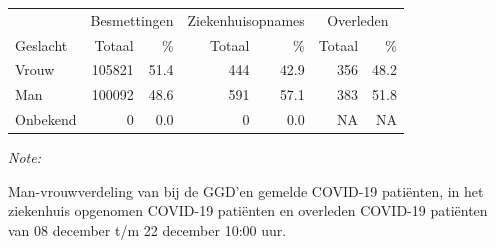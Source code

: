 \documentclass[
  english,
  man,floatsintext]{apa6}
\begin{document}
\begin{table}
\centering\begingroup\fontsize{11}{13}\selectfont

\begin{threeparttable}
\begin{tabular}{lrrrrrr}
\toprule
\multicolumn{1}{c}{ } & \multicolumn{2}{c}{Besmettingen} & \multicolumn{2}{c}{Ziekenhuisopnames} & \multicolumn{2}{c}{Overleden} \\
\cmidrule(l{3pt}r{3pt}){2-3} \cmidrule(l{3pt}r{3pt}){4-5} \cmidrule(l{3pt}r{3pt}){6-7}
Geslacht & Totaal & \% & Totaal & \% & Totaal & \%\\
\midrule
Vrouw & 105821 & 51.4 & 444 & 42.9 & 356 & 48.2\\
Man & 100092 & 48.6 & 591 & 57.1 & 383 & 51.8\\
Onbekend & 0 & 0.0 & 0 & 0.0 & NA & NA\\
\bottomrule
\end{tabular}
\begin{tablenotes}
\item \textit{Note: } 
\item Man-vrouwverdeling van bij de GGD’en gemelde COVID-19 patiënten, in het ziekenhuis opgenomen COVID-19 patiënten en overleden COVID-19 patiënten van 08 december t/m 22 december 10:00 uur.
\end{tablenotes}
\end{threeparttable}
\endgroup{}
\end{table}
\newpage
\end{document}
